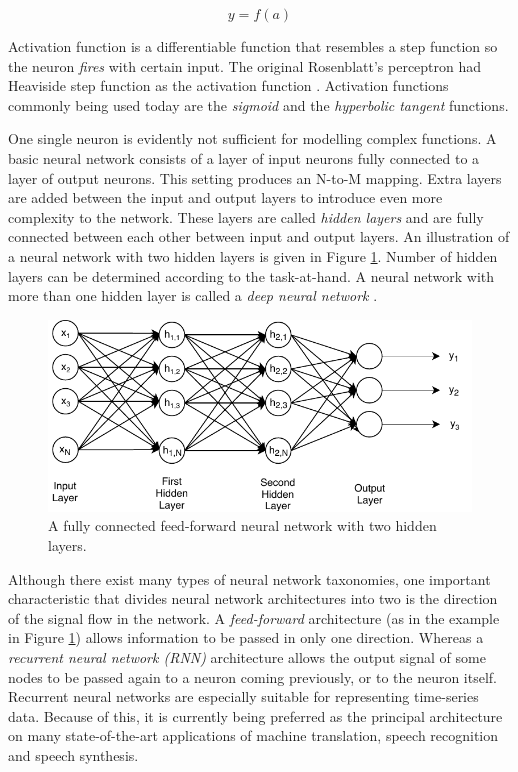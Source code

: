 \begin{equation}
    y = f(a)
\end{equation}

Activation function is a differentiable function that resembles a step function so the neuron \textit{fires} with certain input. The original Rosenblatt's perceptron had Heaviside step function as the activation function \citep{Rosenblatt58theperceptron}. Activation functions commonly being used today are the \textit{sigmoid} and the \textit{hyperbolic tangent} functions. 

One single neuron is evidently not sufficient for modelling complex functions. A basic neural network consists of a layer of input neurons fully connected to a layer of output neurons. This setting produces an N-to-M mapping. Extra layers are added between the input and output layers to introduce even more complexity to the network. These layers are called \textit{hidden layers} and are fully connected between each other between input and output layers. An illustration of a neural network with two hidden layers is given in Figure \ref{sota:neuralnet}. Number of hidden layers can be determined according to the task-at-hand. A neural network with more than one hidden layer is called a \textit{deep neural network} \citep{yoav}. 

\begin{figure}[t]
  \centering
  \includegraphics[width=0.9\linewidth]{img/NeuralNet.pdf}
  \caption{A fully connected feed-forward neural network with two hidden layers.}
  \label{sota:neuralnet}
\end{figure}

Although there exist many types of neural network taxonomies, one important characteristic that divides neural network architectures into two is the direction of the signal flow in the network. A \textit{feed-forward} architecture (as in the example in Figure \ref{sota:neuralnet}) allows information to be passed in only one direction. Whereas a \textit{recurrent neural network (RNN)} architecture allows the output signal of some nodes to be passed again to a neuron coming previously, or to the neuron itself. Recurrent neural networks are especially suitable for representing time-series data. Because of this, it is currently being preferred as the principal architecture on many state-of-the-art applications of machine translation, speech recognition and speech synthesis. 

